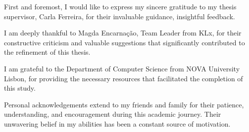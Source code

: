 
%

\begin{ntacknowledgements}

First and foremost, I would like to express my sincere gratitude to my thesis supervisor, Carla Ferreira, for their invaluable guidance, insightful feedback.

I am deeply thankful to Magda Encarnação, Team Leader from KLx, for their constructive criticism and valuable suggestions that significantly contributed to the refinement of this thesis.

I am grateful to the Department of Computer Science from NOVA University Lisbon, for providing the necessary resources that facilitated the completion of this study.

Personal acknowledgements extend to my friends and family for their patience, understanding, and encouragement during this academic journey. Their unwavering belief in my abilities has been a constant source of motivation.

\end{ntacknowledgements}
